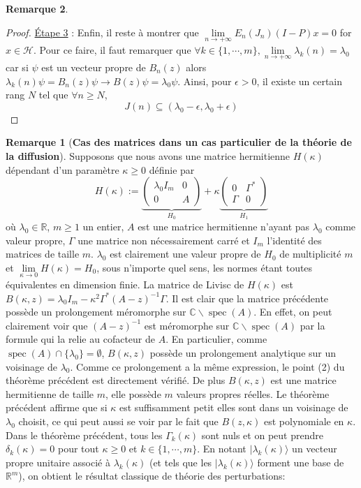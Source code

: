 \documentclass[12pt,openany,a4paper, titlepage]{article}
\newcommand{\R}{\mathbb{R}}
\newcommand{\C}{\mathbb{C}}
\newcommand{\HH}{\mathcal{H}}
\newcommand{\spec}{\operatorname{spec}}
\theoremstyle{definition}
\theoremstyle{definition}
\theoremstyle{definition}
\theoremstyle{definition}
\theoremstyle{definition}
\newtheorem{rem}{Remarque}
\theoremstyle{definition}
\begin{document}
\begin{rem}
\begin{proof}
\underline{Étape 3} : Enfin, il reste à montrer que $\lim\limits_{n\rightarrow +\infty} E_n(J_n) (I-P)x = 0$ for $x\in\HH$. Pour ce faire, il faut remarquer que $\forall k\in \{1,\cdots,m\}, \lim\limits_{n\rightarrow +\infty}\lambda_k(n) = \lambda_0$ car si $\psi$ est un vecteur propre de $B_n(z)$ alors $\lambda_k(n) \psi = B_n(z)\psi \rightarrow B(z) \psi = \lambda_0 \psi$. Ainsi, pour $\epsilon >0$, il existe un certain rang $N$ tel que $\forall n\geq N$, 
\begin{equation}
    J(n) \subseteq (\lambda_0 - \epsilon, \lambda_0 + \epsilon)
\end{equation}
\end{proof}

\begin{rem}[\textbf{Cas des matrices dans un cas particulier de la théorie de la diffusion}]
Supposons que nous avons une matrice hermitienne $H(\kappa)$ dépendant d'un paramètre $\kappa \geq 0$ définie par $$H(\kappa) := 
\underbrace{\begin{pmatrix}
\lambda_0 I_m & 0 \\
0    & A 
\end{pmatrix}}_{H_0} + \kappa
\underbrace{\begin{pmatrix}
0        & \Gamma^* \\
\Gamma &  0
\end{pmatrix}}_{H_1}$$ où $\lambda_0\in\R$, $m\geq 1$ un entier, $A$ est une matrice hermitienne n'ayant pas $\lambda_0$ comme valeur propre, $\Gamma$ une matrice non nécessairement carré et $I_m$ l'identité des matrices de taille $m$. $\lambda_0$ est clairement une valeur propre de $H_0$ de multiplicité $m$ et $\lim\limits_{\kappa\rightarrow 0} H(\kappa) = H_0$, sous n'importe quel sens, les normes étant toutes équivalentes en dimension finie. La matrice de Livisc de $H(\kappa)$ est $B(\kappa,z) = \lambda_0I_m - \kappa^2\Gamma^* (A-z)^{-1} \Gamma$. Il est clair que la matrice précédente possède un prolongement méromorphe sur $\C\backslash \spec(A)$. En effet, on peut clairement voir que $(A-z)^{-1}$ est méromorphe sur $\C\backslash \spec(A)$ par la formule qui la relie au cofacteur de $A$. En particulier, comme $\spec(A)\cap \{\lambda_0\} = \emptyset$, $B(\kappa,z)$ possède un prolongement analytique sur un voisinage de $\lambda_0$. Comme ce prolongement a la même expression, le point (2) du théorème précédent est directement vérifié. De plus $B(\kappa,z)$ est une matrice hermitienne de taille $m$, elle possède $m$ valeurs propres réelles. Le théorème précédent affirme que si $\kappa$ est suffisamment petit elles sont dans un voisinage de $\lambda_0$ choisit, ce qui peut aussi se voir par le fait que $B(z,\kappa)$ est polynomiale en $\kappa$. Dans le théorème précédent, tous les $\Gamma_k(\kappa)$ sont nuls et on peut prendre $\delta_k(\kappa) = 0$ pour tout $\kappa\geq 0$ et $k\in\{1,\cdots,m\}$. En notant $|\lambda_k(\kappa)\rangle$ un vecteur propre unitaire associé à $\lambda_k(\kappa)$ (et tels que les $|\lambda_k(\kappa)\rangle$ forment une base de $\R^m$), on obtient le résultat classique de théorie des perturbations:

\end{rem}
\end{rem}
\end{document}
